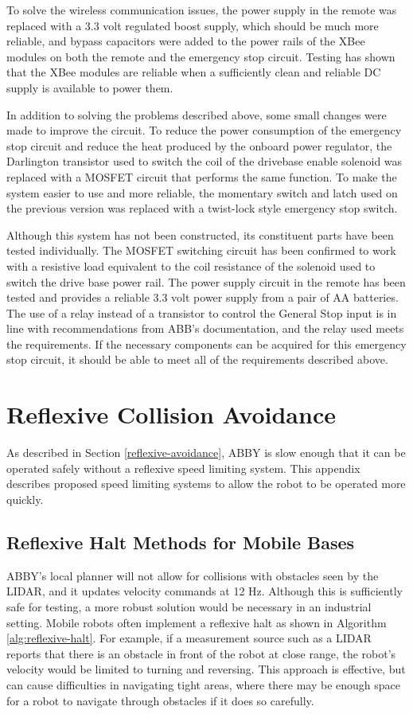 \documentclass[]{cwru} %
\begin{document}
To solve the wireless communication issues, the power supply in the
remote was replaced with a 3.3 volt regulated boost supply, which should
be much more reliable, and bypass capacitors were added to the power
rails of the XBee modules on both the remote and the emergency stop
circuit. Testing has shown that the XBee modules are reliable when a
sufficiently clean and reliable DC supply is available to power them.

In addition to solving the problems described above, some small changes
were made to improve the circuit. To reduce the power consumption of the
emergency stop circuit and reduce the heat produced by the onboard power
regulator, the Darlington transistor used to switch the coil of the
drivebase enable solenoid was replaced with a MOSFET circuit that
performs the same function. To make the system easier to use and more
reliable, the momentary switch and latch used on the previous version
was replaced with a twist-lock style emergency stop switch.

Although this system has not been constructed, its constituent parts
have been tested individually. The MOSFET switching circuit has been
confirmed to work with a resistive load equivalent to the coil
resistance of the solenoid used to switch the drive base power rail. The
power supply circuit in the remote has been tested and provides a
reliable 3.3 volt power supply from a pair of AA batteries. The use of a
relay instead of a transistor to control the General Stop input is in
line with recommendations from ABB's documentation, and the relay used
meets the requirements. If the necessary components can be acquired for
this emergency stop circuit, it should be able to meet all of the
requirements described above.

\chapter{Reflexive Collision Avoidance}

As described in Section \ref{reflexive-avoidance}, ABBY is slow enough that it can be operated
safely without a reflexive speed limiting system. This appendix
describes proposed speed limiting systems to allow the robot to be
operated more quickly.

\section{Reflexive Halt Methods for Mobile Bases}

ABBY's local planner will not allow for collisions with obstacles seen
by the LIDAR, and it updates velocity commands at 12 Hz. Although this
is sufficiently safe for testing, a more robust solution would be
necessary in an industrial setting. Mobile robots often implement a
reflexive halt as shown in Algorithm \ref{alg:reflexive-halt}. For example,
if a measurement source such as a LIDAR reports that there is an obstacle in 
front of the robot at close range, the robot's velocity would be limited to 
turning and reversing. This approach is effective, but can cause difficulties 
in navigating tight areas, where there may be enough space for a robot to
navigate through obstacles if it does so carefully.
\end{document}
